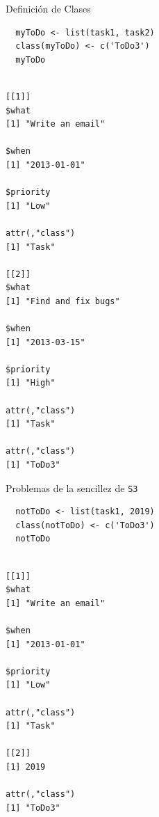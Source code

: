 \documentclass[xcolor={usenames,svgnames,dvipsnames}]{beamer}
\begin{document}
\begin{frame}[label={sec:org6afc0fe},fragile]{Definición de Clases}
 \lstset{language=r,label= ,caption= ,captionpos=b,numbers=none}
\begin{lstlisting}
  myToDo <- list(task1, task2)
  class(myToDo) <- c('ToDo3')
  myToDo
\end{lstlisting}

\begin{verbatim}

[[1]]
$what
[1] "Write an email"

$when
[1] "2013-01-01"

$priority
[1] "Low"

attr(,"class")
[1] "Task"

[[2]]
$what
[1] "Find and fix bugs"

$when
[1] "2013-03-15"

$priority
[1] "High"

attr(,"class")
[1] "Task"

attr(,"class")
[1] "ToDo3"
\end{verbatim}
\end{frame}

\begin{frame}[label={sec:orgb6f06f5},fragile]{Problemas de la sencillez de \texttt{S3}}
 \lstset{language=r,label= ,caption= ,captionpos=b,numbers=none}
\begin{lstlisting}
  notToDo <- list(task1, 2019)
  class(notToDo) <- c('ToDo3')
  notToDo
\end{lstlisting}

\begin{verbatim}

[[1]]
$what
[1] "Write an email"

$when
[1] "2013-01-01"

$priority
[1] "Low"

attr(,"class")
[1] "Task"

[[2]]
[1] 2019

attr(,"class")
[1] "ToDo3"
\end{verbatim}
\end{frame}
\end{document}
